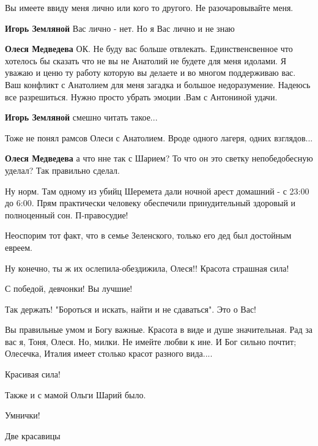 \begin{itemize}
\begin{itemize}
Вы имеете ввиду меня лично или кого то другого. Не разочаровывайте меня.

\textbf{Игорь Земляной} Вас лично - нет. Но я Вас лично и не знаю

\textbf{Олеся Медведева} ОК. Не буду вас больше отвлекать. Единственсвенное что
хотелось бы сказать что не вы не Анатолий не будете для меня идолами. Я уважаю и
ценю ту работу которую вы делаете и во многом поддерживаю вас. Ваш конфликт с
Анатолием для меня загадка и большое недоразумение. Надеюсь все
разрешиться. Нужно просто убрать эмоции .Вам с Антониной удачи.

\textbf{Игорь Земляной} смешно читать такое...

Тоже не понял рамсов Олеси с Анатолием. Вроде одного лагеря, одних взглядов...

\textbf{Олеся Медведева} а что нне так с Шарием? То что он это светку непобедобесную уделал? Так правильно сделал.
\end{itemize} %


Ну норм. Там одному из убийц Шеремета дали ночной арест домашний - с 23:00 до
6:00. Прям практически человеку обеспечили принудительный здоровый и
полноценный сон. П-правосудие!

Неоспорим тот факт, что в семье Зеленского, только его дед был достойным евреем.

Ну конечно, ты ж их ослепила-обездижила, Олеся!! Красота страшная сила!

С победой, девчонки! Вы лучшие!

Так держать! "Бороться и искать, найти и не сдаваться". Это о Вас!


Вы правильные умом и Богу важные. Красота в виде и душе значительная. Рад за
вас я, Тоня, Олеся. Но, милки. Не имейте любви к ине. И Бог сильно почтит;
Олесечка, Италия имеет столько красот разного вида....

Красивая сила!

Также и с мамой Ольги Шарий было.

Умнички!

Две красавицы


\end{itemize}
